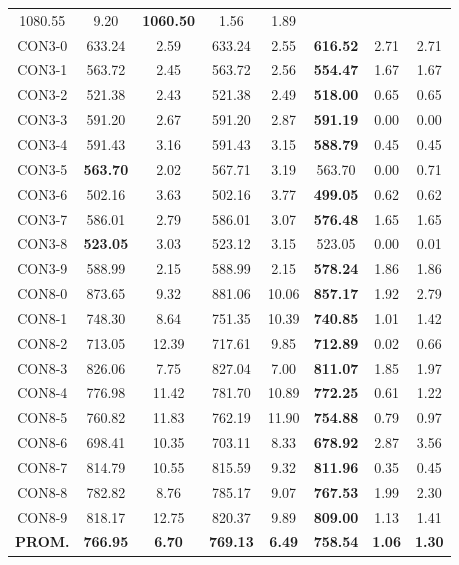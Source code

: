 \begin{table}[h]
\begin{tabular}{c c c c c c c c}
1080.55 & 9.20 & \bf{1060.50} & 
1.56 & 1.89\\CON3-0 & 633.24 & 2.59 & 
633.24 & 2.55 & \bf{616.52} & 
2.71 & 2.71\\CON3-1 & 563.72 & 2.45 & 
563.72 & 2.56 & \bf{554.47} & 
1.67 & 1.67\\CON3-2 & 521.38 & 2.43 & 
521.38 & 2.49 & \bf{518.00} & 
0.65 & 0.65\\CON3-3 & 591.20 & 2.67 & 
591.20 & 2.87 & \bf{591.19} & 
0.00 & 0.00\\CON3-4 & 591.43 & 3.16 & 
591.43 & 3.15 & \bf{588.79} & 
0.45 & 0.45\\CON3-5 & \bf{563.70} & 2.02 & 
567.71 & 3.19 & 563.70 & 0.00
 & 0.71\\CON3-6 & 502.16 & 3.63 & 
502.16 & 3.77 & \bf{499.05} & 
0.62 & 0.62\\CON3-7 & 586.01 & 2.79 & 
586.01 & 3.07 & \bf{576.48} & 
1.65 & 1.65\\CON3-8 & \bf{523.05} & 3.03 & 
523.12 & 3.15 & 523.05 & 0.00
 & 0.01\\CON3-9 & 588.99 & 2.15 & 
588.99 & 2.15 & \bf{578.24} & 
1.86 & 1.86\\CON8-0 & 873.65 & 9.32 & 
881.06 & 10.06 & \bf{857.17} & 
1.92 & 2.79\\CON8-1 & 748.30 & 8.64 & 
751.35 & 10.39 & \bf{740.85} & 
1.01 & 1.42\\CON8-2 & 713.05 & 12.39 & 
717.61 & 9.85 & \bf{712.89} & 
0.02 & 0.66\\CON8-3 & 826.06 & 7.75 & 
827.04 & 7.00 & \bf{811.07} & 
1.85 & 1.97\\CON8-4 & 776.98 & 11.42 & 
781.70 & 10.89 & \bf{772.25} & 
0.61 & 1.22\\CON8-5 & 760.82 & 11.83 & 
762.19 & 11.90 & \bf{754.88} & 
0.79 & 0.97\\CON8-6 & 698.41 & 10.35 & 
703.11 & 8.33 & \bf{678.92} & 
2.87 & 3.56\\CON8-7 & 814.79 & 10.55 & 
815.59 & 9.32 & \bf{811.96} & 
0.35 & 0.45\\CON8-8 & 782.82 & 8.76 & 
785.17 & 9.07 & \bf{767.53} & 
1.99 & 2.30\\CON8-9 & 818.17 & 12.75 & 
820.37 & 9.89 & \bf{809.00} & 
1.13 & 1.41\\\bf{PROM.} & 
\bf{766.95} & \bf{6.70} & \bf{769.13} & \bf{6.49} & \bf{758.54} & \bf{1.06} & \bf{1.30}\\[1ex]\hline
\end{tabular}
\label{table:SS-M-150-0.5}
\end{table}

